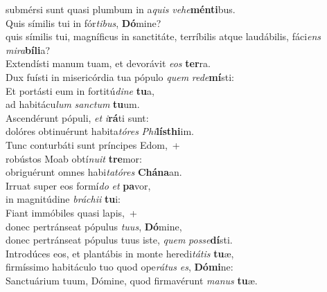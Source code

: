 \oddverse submérsi sunt quasi plumbum in a\textit{quis} \textit{ve}\textit{he}\textbf{mén}\textbf{ti}bus.\\
\evenverse Quis símilis tui in fór\textit{ti}\textit{bus}, \textbf{Dó}mine?~\*\\
\evenverse quis símilis tui, magníficus in sanctitáte, terríbilis atque laudábilis, fáci\textit{ens} \textit{mi}\textit{ra}\textbf{bí}\textbf{li}a?\\
\oddverse Extendísti manum tuam, et devorávit \textit{e}\textit{os} \textbf{ter}ra.~\*\\
\oddverse Dux fuísti in misericórdia tua pópulo \textit{quem} \textit{re}\textit{de}\textbf{mí}sti:\\
\evenverse Et portásti eum in fortitú\textit{di}\textit{ne} \textbf{tu}a,~\*\\
\evenverse ad habitácu\textit{lum} \textit{san}\textit{ctum} \textbf{tu}um.\\
\oddverse Ascendérunt pópuli, \textit{et} \textit{i}\textbf{rá}ti sunt:~\*\\
\oddverse dolóres obtinuérunt habita\textit{tó}\textit{res} \textit{Phi}\textbf{lís}\textbf{thi}im.\\
\evenverse Tunc conturbáti sunt príncipes Edom,~+\\
\evenverse  robústos Moab obtí\textit{nu}\textit{it} \textbf{tre}mor:~\*\\
\evenverse obriguérunt omnes habi\textit{ta}\textit{tó}\textit{res} \textbf{Chá}\textbf{na}an.\\
\oddverse Irruat super eos formí\textit{do} \textit{et} \textbf{pa}vor,~\*\\
\oddverse in magnitúdine \textit{brá}\textit{chi}\textit{i} \textbf{tu}i:\\
\evenverse Fiant immóbiles quasi lapis,~+\\
\evenverse  donec pertránseat pópulus \textit{tu}\textit{us}, \textbf{Dó}mine,~\*\\
\evenverse donec pertránseat pópulus tuus iste, \textit{quem} \textit{pos}\textit{se}\textbf{dí}sti.\\
\oddverse Introdúces eos, et plantábis in monte heredi\textit{tá}\textit{tis} \textbf{tu}æ,~\*\\
\oddverse firmíssimo habitáculo tuo quod ope\textit{rá}\textit{tus} \textit{es}, \textbf{Dó}\textbf{mi}ne:\\
\evenverse Sanctuárium tuum, Dómine, quod firmavérunt \textit{ma}\textit{nus} \textbf{tu}æ.~\*\\
